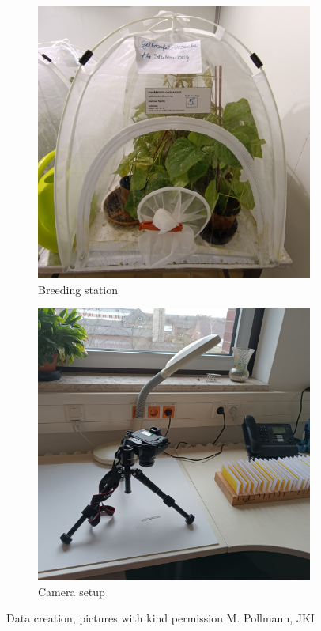 \documentclass[12pt,a4paper]{article}
\begin{document}
\begin{figure}[H]
    \centering
    \begin{subfigure}{0.45\textwidth}
        \centering
        \includegraphics[width=\linewidth]{images/figure3a_zucht.jpg}
        \caption{Breeding station}
        \label{fig:breeding}
    \end{subfigure}
    \hfill
    \begin{subfigure}{0.45\textwidth}
        \centering
        \includegraphics[width=\linewidth]{images/figure3b_canon.jpg}
        \caption{Camera setup}
        \label{fig:canon}
    \end{subfigure}
    
    \caption{Data creation, pictures with kind permission M. Pollmann, JKI}
    \label{fig:data_creation}
\end{figure}
\end{document}
